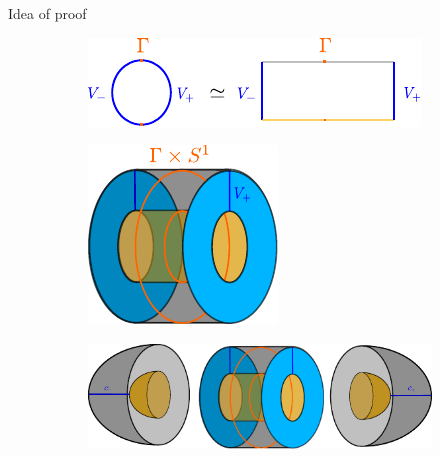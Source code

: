 \documentclass{beamer}
\begin{document}
\begin{frame}{Idea of proof}
    \begin{figure}
        \begin{subfigure}[t]{.54\linewidth}
            \includegraphics[trim=-.3cm -.5cm -.3cm -.5cm, width=\linewidth]{../images/convex_decomposition_of_s1.pdf}
        \end{subfigure}
        \begin{subfigure}[t]{.35\linewidth}
            \includegraphics[trim=-.5cm -.5cm -.5cm -.5cm, width=\linewidth]{../images/v_times_s1.pdf}
        \end{subfigure}
        \begin{subfigure}{.8\linewidth}
            \includegraphics[trim=-.5cm -.5cm -.5cm -.5cm, width=\linewidth]{../images/capping_cobordism_talk.pdf}
        \end{subfigure}
    \end{figure}
\end{frame}
\end{document}
